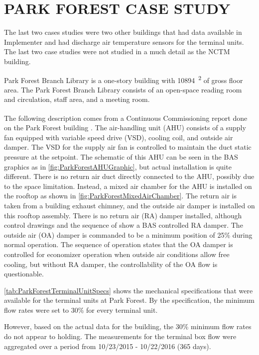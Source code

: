 \chapter{\texorpdfstring{\MakeUppercase{Park Forest Case Study}}{Park Forest Case Study}}

The last two cases studies were two other buildings that had data
available in Implementer and had discharge air temperature sensors for
the terminal units. The last two case studies were not studied in a much
detail as the NCTM building. 

Park Forest Branch Library is a one-story building with
\SI{10894}{\feet\squared} of gross floor area. The Park Forest Branch
Library consists of an open-space reading room and circulation, staff
area, and a meeting room.

The following description comes from a Continuous
Commissioning\textsuperscript{\textregistered{}} report
done on the Park Forest building \cite{ParkForestReport}. The air-handling unit (AHU) consists
of a supply fan equipped with variable speed drive (VSD), cooling coil,
and outside air damper. The VSD for the supply air fan is controlled to
maintain the duct static pressure at the setpoint. The schematic of this AHU can
be seen in the BAS graphics as in \figref{}
\ref{fig:ParkForestAHUGraphic}, but actual installation is
quite different. There is no return air duct directly connected to the
AHU, possibly due to the space limitation. Instead, a mixed air chamber
for the AHU is installed on the rooftop as shown in \figref{}
\ref{fig:ParkForestMixedAirChamber}. The return
air is taken from a building exhaust chimney, and the outside air damper
is installed on this rooftop assembly. There is no return air (RA)
damper installed, although control drawings and the sequence of show a
BAS controlled RA damper. The outside air (OA) damper is commanded to be
a minimum position of 25\% during normal operation. The sequence of
operation states that the OA damper is controlled for economizer
operation when outside air conditions allow free cooling, but without
RA damper, the controllability of the OA flow is questionable.

\tableref{} \ref{tab:ParkForestTerminalUnitSpecs} shows the
mechanical specifications that were available for the terminal units at
Park Forest. By the specification, the minimum flow rates were set to
30\% for every terminal unit. 

However, based on the actual data for the building, the 30\% minimum
flow rates do not appear to holding. The measurements for the terminal
box flow were aggregated over a period from 10/23/2015 - 10/22/2016
(365 days). 

